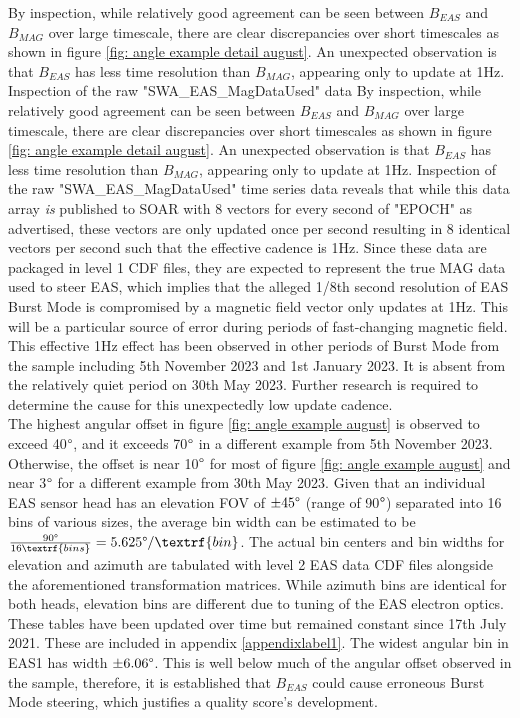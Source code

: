By inspection, while relatively good agreement can be seen between \(B_{EAS}\) and \(B_{MAG}\) over large timescale, there are clear discrepancies over short timescales as shown in figure \ref{fig: angle example detail august}. An unexpected observation is that \(B_{EAS}\) has less time resolution than \(B_{MAG}\), appearing only to update at 1Hz. Inspection of the raw "SWA\_EAS\_MagDataUsed" data 
By inspection, while relatively good agreement can be seen between \(B_{EAS}\) and \(B_{MAG}\) over large timescale, there are clear discrepancies over short timescales as shown in figure \ref{fig: angle example detail august}. An unexpected observation is that \(B_{EAS}\) has less time resolution than \(B_{MAG}\), appearing only to update at 1Hz. Inspection of the raw "SWA\_EAS\_MagDataUsed" time series data reveals that while this data array \textit{is} published to SOAR with 8 vectors for every second of "EPOCH" as advertised, these vectors are only updated once per second resulting in 8 identical vectors per second such that the effective cadence is 1Hz. Since these data are packaged in level 1 CDF files, they are expected to represent the true MAG data used to steer EAS, which implies that the alleged 1/8th second resolution of EAS Burst Mode is compromised by a magnetic field vector only updates at 1Hz. This will be a particular source of error during periods of fast-changing magnetic field. This effective 1Hz effect has been observed in other periods of Burst Mode from the sample including 5th November 2023 and 1st January 2023. It is absent from the relatively quiet period on 30th May 2023. Further research is required to determine the cause for this unexpectedly low update cadence.
\\

The highest angular offset in figure \ref{fig: angle example august} is observed to exceed 40\(\degree\), and it exceeds 70\(\degree\) in a different example from 5th November 2023. Otherwise, the offset is near 10\(\degree\) for most of figure \ref{fig: angle example august} and near 3\(\degree\) for a different example from 30th May 2023. Given that an individual EAS sensor head has an elevation FOV of \(\pm45\degree\) (range of 90\(\degree\)) separated into 16 bins of various sizes, the average bin width can be estimated to be \(\frac{90\degree}{16 \textrf{bins}} = 5.625\degree / \textrf{bin}\). The actual bin centers and bin widths for elevation and azimuth are tabulated with level 2 EAS data CDF files alongside the aforementioned transformation matrices. While azimuth bins are identical for both heads, elevation bins are different due to tuning of the EAS electron optics. These tables have been updated over time but remained constant since 17th July 2021. These are included in appendix \ref{appendixlabel1}. The widest angular bin in EAS1 has width \(\pm6.06\degree\). This is well below much of the angular offset observed in the sample, therefore, it is established that \(B_{EAS}\) could cause erroneous Burst Mode steering, which justifies a quality score's development.

